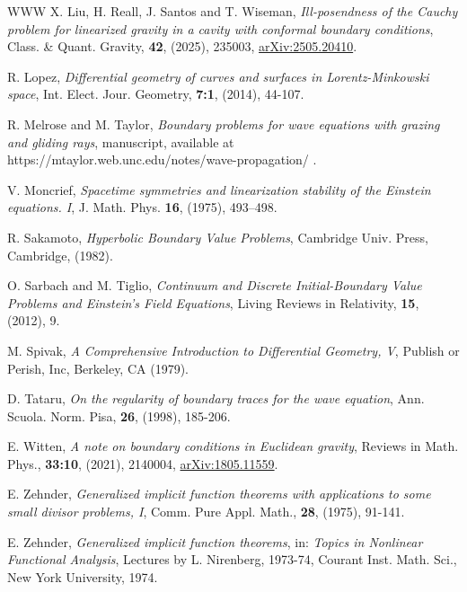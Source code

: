 \documentclass[10pt]{amsart}
\newcommand{\<}{\langle}
\renewcommand{\>}{\rangle}
\theoremstyle{plain}
\theoremstyle{remark}
\theoremstyle{definition}
\numberwithin{equation}{section}
\begin{document}
\begin{thebibliography}{WWW}
 X. Liu, H. Reall, J. Santos and T. Wiseman, {\it Ill-posendness of the Cauchy problem for linearized gravity in a cavity with 
conformal boundary conditions}, Class. \& Quant. Gravity, {\bf 42}, (2025), 235003, \href{https://arXiv.org/abs/2505.20410}{arXiv:2505.20410}.

 R. Lopez, {\it Differential geometry of curves and surfaces in Lorentz-Minkowski space}, 
Int. Elect. Jour. Geometry, {\bf 7:1}, (2014), 44-107. 

 R. Melrose and M. Taylor, {\it Boundary problems for wave equations with grazing and gliding rays}, 
manuscript, available at https://mtaylor.web.unc.edu/notes/wave-propagation/ .

 V. Moncrief, {\it Spacetime symmetries and linearization stability of the Einstein equations. I}, 
J. Math. Phys. {\bf 16}, (1975), 493–498. 

 R. Sakamoto, {\it Hyperbolic Boundary Value Problems}, Cambridge Univ. Press, Cambridge, (1982). 

 O. Sarbach and M. Tiglio, {\it Continuum and Discrete Initial-Boundary Value Problems and Einstein's Field 
Equations}, Living Reviews in Relativity, {\bf 15}, (2012), 9. 

 M. Spivak, {\it A Comprehensive Introduction to Differential Geometry, V}, Publish or Perish, Inc, Berkeley, CA 
(1979).  

 D. Tataru, {\it On the regularity of boundary traces for the wave equation}, Ann. Scuola. Norm. Pisa, {\bf 26}, 
(1998), 185-206. 

 E. Witten, {\it A note on boundary conditions in Euclidean gravity}, Reviews in Math. Phys., {\bf 33:10}, (2021), 
2140004, \href{https://arXiv.org/abs/1805.11559}{arXiv:1805.11559}. 

 E. Zehnder, {\it Generalized implicit function theorems with applications to some small divisor problems, I}, 
Comm. Pure Appl. Math., {\bf 28}, (1975), 91-141. 

 E. Zehnder, {\it Generalized implicit function theorems}, in: {\it Topics in Nonlinear Functional Analysis}, Lectures 
by L. Nirenberg, 1973-74, Courant Inst. Math. Sci., New York University, 1974. 
 




\end{thebibliography} 
\end{document}
